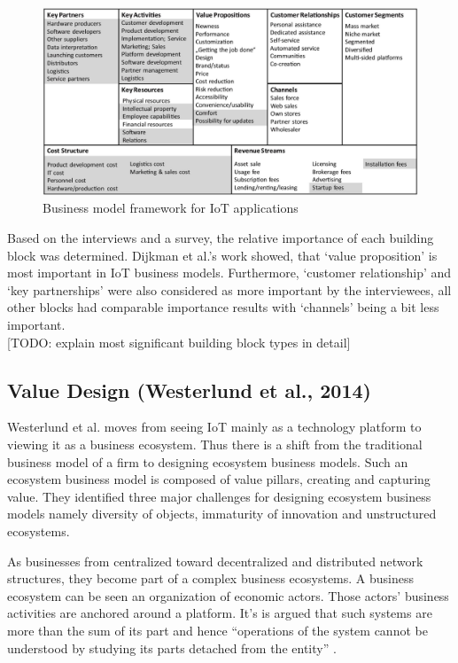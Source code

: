 		\begin{figure}[ht]
			\begin{center}
		    \includegraphics[scale=0.52]{Talk11/iot_canvas_dijkman.jpg}
		    \end{center}
		    \caption{Business model framework for IoT applications}
		    \label{fig:bm_dijkman}
		\end{figure}

		Based on the interviews and a survey, the relative importance of each building block was determined. Dijkman et al.'s work showed, that `value proposition' is most important in IoT business models. Furthermore, `customer relationship' and `key  partnerships' were also considered as more important by the interviewees, all other blocks had comparable importance results with  `channels' being a bit less important.\\    
		[TODO: wrapup][TODO: explain most significant building block types in detail]

	\subsection{Value Design (Westerlund et al., 2014)}
		Westerlund et al. moves from seeing IoT mainly as a technology platform to viewing it as a business ecosystem. Thus there is a shift from the traditional business model of a firm to designing ecosystem business models. Such an ecosystem business model is composed of value pillars, creating and capturing value. They identified three major challenges for designing ecosystem business models namely diversity of objects, immaturity of innovation and unstructured ecosystems.

		As businesses from centralized toward decentralized and distributed network structures, they become part of a complex business ecosystems. A business ecosystem can be seen an organization of economic actors. Those actors' business activities are anchored around a platform. It's is argued that such systems are more than the sum of its part and hence ``operations of the system cannot be understood by studying its parts detached from the entity'' \cite{westerlund}.

